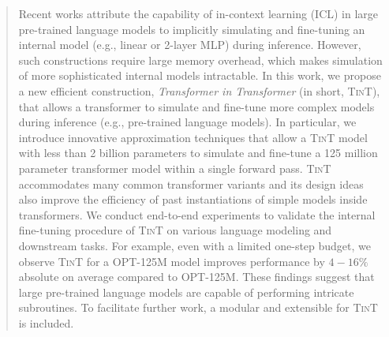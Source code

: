 \begin{abstract}
 Recent works attribute the capability of in-context learning (ICL) in large pre-trained language models to implicitly simulating and fine-tuning an internal model (e.g., linear or 2-layer MLP) during inference. 
 However, such constructions require large memory overhead, which makes simulation of more sophisticated internal models intractable.
In this work, we propose a new efficient construction, {\em Transformer in Transformer} (in short, \textsc{TinT}), that allows a transformer to simulate and fine-tune more complex models during inference (e.g., pre-trained language models). 
 In particular, we introduce  innovative approximation techniques that allow a \textsc{TinT} model with less than 2 billion parameters to simulate and fine-tune a 125 million parameter transformer model within a single forward pass.
 \textsc{TinT} accommodates many common transformer variants and its design ideas also improve the efficiency of past instantiations of simple models inside transformers.  
We conduct end-to-end experiments to validate the internal fine-tuning procedure of \textsc{TinT} on various language modeling and downstream tasks. For example, even with a limited one-step budget, we observe \textsc{TinT} for a \textsc{OPT-125M} model improves performance by $4-16\%$ absolute on average compared to \textsc{OPT-125M}. These findings suggest that large pre-trained language models are capable of performing intricate subroutines. To facilitate further work, a modular and extensible   for \textsc{TinT} is included. 
\end{abstract}

